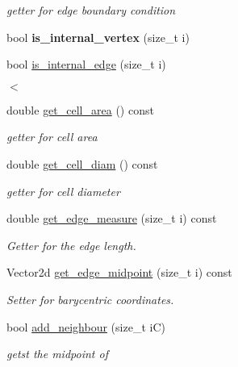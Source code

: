 \begin{DoxyCompactItemize}
\begin{DoxyCompactList}\small\item\em getter for edge boundary condition \end{DoxyCompactList}\item 
\mbox{\label{classMeshFramework2D_1_1Cell2D_a54d1d37333af79791b63f9dd7459f41a}} 
bool {\bfseries is\+\_\+internal\+\_\+vertex} (size\+\_\+t i)
\item 
bool \hyperlink{classMeshFramework2D_1_1Cell2D_a34eab4c0d682a445d3536d6a8b0e7ed2}{is\+\_\+internal\+\_\+edge} (size\+\_\+t i)
\begin{DoxyCompactList}\small\item\em $<$ \end{DoxyCompactList}\item 
double \hyperlink{classMeshFramework2D_1_1Cell2D_aa77363c693484427ca71d607e376be2f}{get\+\_\+cell\+\_\+area} () const
\begin{DoxyCompactList}\small\item\em getter for cell area \end{DoxyCompactList}\item 
double \hyperlink{classMeshFramework2D_1_1Cell2D_abf59b323d39cda1f6f65c6ba83247ca9}{get\+\_\+cell\+\_\+diam} () const
\begin{DoxyCompactList}\small\item\em getter for cell diameter \end{DoxyCompactList}\item 
double \hyperlink{classMeshFramework2D_1_1Cell2D_ae2f7c7e6c4a58c2851b0ed0735af4035}{get\+\_\+edge\+\_\+measure} (size\+\_\+t i) const
\begin{DoxyCompactList}\small\item\em Getter for the edge length. \end{DoxyCompactList}\item 
Vector2d \hyperlink{classMeshFramework2D_1_1Cell2D_a2b3ce883ce985125cc43d7c7509854cc}{get\+\_\+edge\+\_\+midpoint} (size\+\_\+t i) const
\begin{DoxyCompactList}\small\item\em Setter for barycentric coordinates. \end{DoxyCompactList}\item 
bool \hyperlink{classMeshFramework2D_1_1Cell2D_a70ba37c58fdfb014865c600c51a59911}{add\+\_\+neighbour} (size\+\_\+t iC)
\begin{DoxyCompactList}\small\item\em getst the midpoint of \end{DoxyCompactList}\item 

\end{DoxyCompactItemize}
